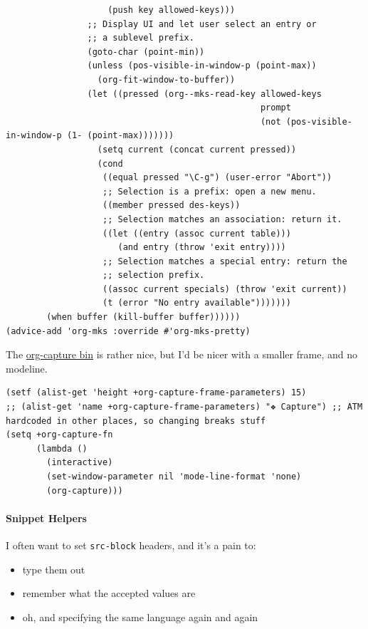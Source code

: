 \documentclass[11pt]{article}
\begin{document}
\begin{verbatim}
                    (push key allowed-keys)))
                ;; Display UI and let user select an entry or
                ;; a sublevel prefix.
                (goto-char (point-min))
                (unless (pos-visible-in-window-p (point-max))
                  (org-fit-window-to-buffer))
                (let ((pressed (org--mks-read-key allowed-keys
                                                  prompt
                                                  (not (pos-visible-in-window-p (1- (point-max)))))))
                  (setq current (concat current pressed))
                  (cond
                   ((equal pressed "\C-g") (user-error "Abort"))
                   ;; Selection is a prefix: open a new menu.
                   ((member pressed des-keys))
                   ;; Selection matches an association: return it.
                   ((let ((entry (assoc current table)))
                      (and entry (throw 'exit entry))))
                   ;; Selection matches a special entry: return the
                   ;; selection prefix.
                   ((assoc current specials) (throw 'exit current))
                   (t (error "No entry available")))))))
        (when buffer (kill-buffer buffer))))))
(advice-add 'org-mks :override #'org-mks-pretty)
\end{verbatim}

The \href{file:///Users/vudangquang/.emacs.d/bin/org-capture}{org-capture bin} is rather nice, but I'd be nicer with a smaller frame, and
no modeline.

\begin{verbatim}
(setf (alist-get 'height +org-capture-frame-parameters) 15)
;; (alist-get 'name +org-capture-frame-parameters) "❖ Capture") ;; ATM hardcoded in other places, so changing breaks stuff
(setq +org-capture-fn
      (lambda ()
        (interactive)
        (set-window-parameter nil 'mode-line-format 'none)
        (org-capture)))
\end{verbatim}

\paragraph{Snippet Helpers}
\label{sec:org0cc09a9}
I often want to set \texttt{src-block} headers, and it's a pain to:
\begin{itemize}
\item type them out
\item remember what the accepted values are
\item oh, and specifying the same language again and again
\end{itemize}
\end{document}
